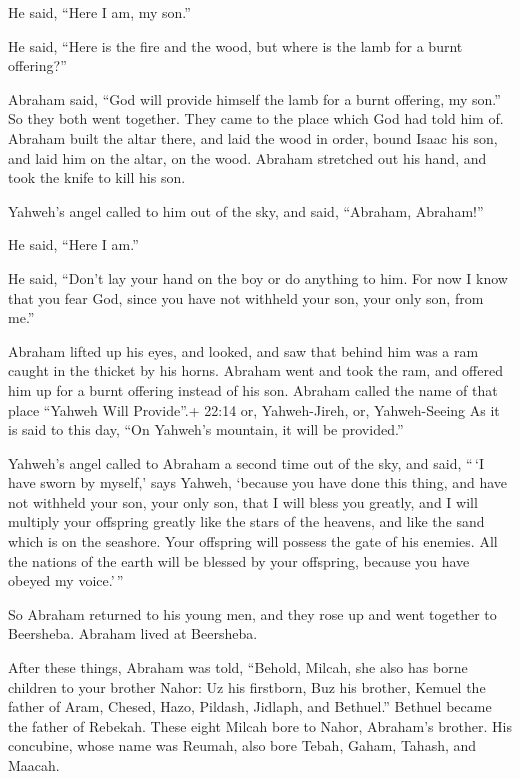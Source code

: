 He said, ``Here I am, my son.''

He said, ``Here is the fire and the wood, but where is the lamb for a
burnt offering?''

 Abraham said, ``God will provide himself the lamb for a
burnt offering, my son.'' So they both went together.  They
came to the place which God had told him of. Abraham built the altar
there, and laid the wood in order, bound Isaac his son, and laid him on
the altar, on the wood.  Abraham stretched out his hand,
and took the knife to kill his son.

 Yahweh's angel called to him out of the sky, and said,
``Abraham, Abraham!''

He said, ``Here I am.''

 He said, ``Don't lay your hand on the boy or do anything
to him. For now I know that you fear God, since you have not withheld
your son, your only son, from me.''

 Abraham lifted up his eyes, and looked, and saw that
behind him was a ram caught in the thicket by his horns. Abraham went
and took the ram, and offered him up for a burnt offering instead of his
son.  Abraham called the name of that place ``Yahweh Will
Provide''.+ 22:14 or, Yahweh-Jireh, or, Yahweh-Seeing As it is said to
this day, ``On Yahweh's mountain, it will be provided.''

 Yahweh's angel called to Abraham a second time out of the
sky,  and said, ``\,`I have sworn by myself,' says Yahweh,
`because you have done this thing, and have not withheld your son, your
only son,  that I will bless you greatly, and I will
multiply your offspring greatly like the stars of the heavens, and like
the sand which is on the seashore. Your offspring will possess the gate
of his enemies.  All the nations of the earth will be
blessed by your offspring, because you have obeyed my voice.'\,''

 So Abraham returned to his young men, and they rose up and
went together to Beersheba. Abraham lived at Beersheba.

 After these things, Abraham was told, ``Behold, Milcah,
she also has borne children to your brother Nahor:  Uz his
firstborn, Buz his brother, Kemuel the father of Aram, 
Chesed, Hazo, Pildash, Jidlaph, and Bethuel.''  Bethuel
became the father of Rebekah. These eight Milcah bore to Nahor,
Abraham's brother.  His concubine, whose name was Reumah,
also bore Tebah, Gaham, Tahash, and Maacah.

